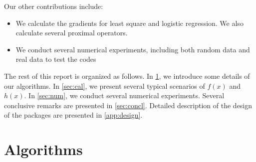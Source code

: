 \documentclass[a4paper]{article}
\begin{document}
  Our other contributions include:
  \begin{itemize}
    \item We calculate the gradients for least 
    square and logistic regression. We also calculate several 
    proximal operators.
    \item We conduct several numerical experiments, including both 
    random data and real data to test the codes
  \end{itemize}
  
  The rest of this report is organized as follows. In \cref{sec:alg}, 
  we introduce some details of our algorithms. In \cref{sec:cal}, we 
  present several typical scenarios of $f(x)$ and $h(x)$. In 
  \cref{sec:num}, we conduct several numerical experiments. Several 
  conclusive remarks are presented in \cref{sec:concl}. Detailed 
  description of the design of the packages are presented in 
  \cref{app:design}.
  
  
  
  \section{Algorithms}
  \label{sec:alg}
  
\end{document}
